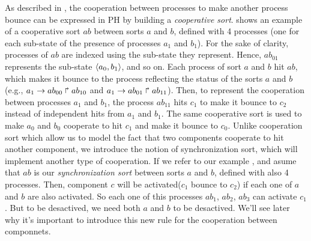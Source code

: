 As described in \cite{PMR10-TCSB}, the cooperation between processes to make another process bounce can be
expressed in PH by building a \emph{cooperative sort}.
 shows an example of a cooperative sort $ab$ between sorts $a$ and $b$,
defined with 4 processes (one for each sub-state of the presence of processes $a_1$ and $b_1$).
For the sake of clarity, processes of $ab$ are indexed using the sub-state they represent.
Hence, $ab_{01}$ represents the sub-state $\langle a_0,b_1 \rangle$, and so on.
Each process of sort $a$ and $b$ hit $ab$, which makes it bounce to the process reflecting the status of the sorts $a$
and $b$ (e.g., $a_1\rightarrow ab_{00}\Rsh ab_{10}$ and $a_1\rightarrow ab_{01}\Rsh ab_{11}$).
Then, to represent the cooperation between processes $a_1$ and $b_1$,
the process $ab_{11}$ hits $c_1$ to make it bounce to $c_2$ instead of
independent hits from $a_1$ and $b_1$.
The same cooperative sort is used to make $a_0$ and $b_0$ cooperate to hit $c_1$ and make it bounce to $c_0$.
Unlike cooperation sort which allow us to model the fact that two components cooperate to hit another component, we introduce
the notion of synchronization sort, which will implement another type of cooperation. If we refer to our example
, and asume that $ab$ is our \emph{synchronization sort} between sorts $a$ and $b$, defined with also 
4 processes. Then, component $c$ will be activated($c_1$ bounce to $c_2$) if each one of $a$ and $b$ are also activated. So each 
one of this processes $ab_1$, $ab_2$, $ab_3$ can activate $c_1$. But to be desactived, we need both $a$ and $b$ to be desactived.
We'll see later why it's important to introduce this new rule for the cooperation between componnets.

